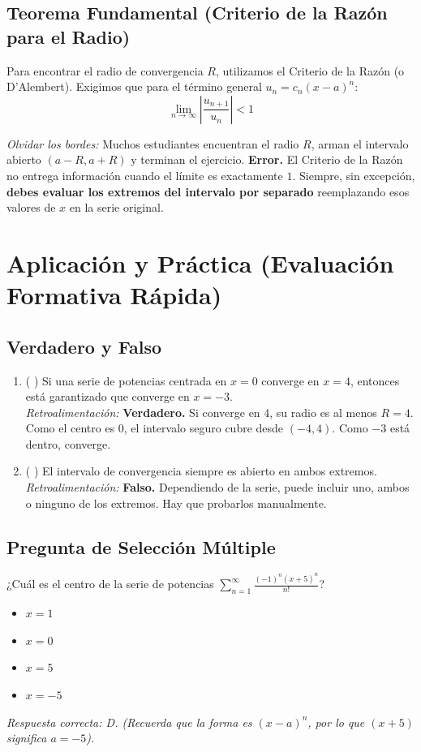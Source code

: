 \documentclass[11pt, a4paper]{article}
\begin{document}
\subsection*{Teorema Fundamental (Criterio de la Razón para el Radio)}
Para encontrar el radio de convergencia $R$, utilizamos el Criterio de la Razón (o D'Alembert). Exigimos que para el término general $u_n = c_n(x-a)^n$:
\[ \lim_{n \to \infty} \left| \frac{u_{n+1}}{u_n} \right| < 1 \]

\begin{tcolorbox}[colback=red!5!white,colframe=red!75!black,title=Error Común (¡Trampa Cognitiva!)]
\textit{Olvidar los bordes:} Muchos estudiantes encuentran el radio $R$, arman el intervalo abierto $(a-R, a+R)$ y terminan el ejercicio. \textbf{Error.} El Criterio de la Razón no entrega información cuando el límite es exactamente $1$. Siempre, sin excepción, \textbf{debes evaluar los extremos del intervalo por separado} reemplazando esos valores de $x$ en la serie original.
\end{tcolorbox}

\section{Aplicación y Práctica (Evaluación Formativa Rápida)}

\subsection*{Verdadero y Falso}
\begin{enumerate}
    \item ( ) Si una serie de potencias centrada en $x=0$ converge en $x=4$, entonces está garantizado que converge en $x=-3$.
    \\ \textit{Retroalimentación:} \textbf{Verdadero.} Si converge en $4$, su radio es al menos $R=4$. Como el centro es $0$, el intervalo seguro cubre desde $(-4, 4)$. Como $-3$ está dentro, converge.
    \item ( ) El intervalo de convergencia siempre es abierto en ambos extremos.
    \\ \textit{Retroalimentación:} \textbf{Falso.} Dependiendo de la serie, puede incluir uno, ambos o ninguno de los extremos. Hay que probarlos manualmente.
\end{enumerate}

\subsection*{Pregunta de Selección Múltiple}
¿Cuál es el centro de la serie de potencias $\sum_{n=1}^{\infty} \frac{(-1)^n (x+5)^n}{n!}$?
\begin{itemize}
    \item[A)] $x = 1$
    \item[B)] $x = 0$
    \item[C)] $x = 5$
    \item[D)] $x = -5$
\end{itemize}
\textit{Respuesta correcta: D. (Recuerda que la forma es $(x-a)^n$, por lo que $(x+5)$ significa $a = -5$).}
\end{document}
